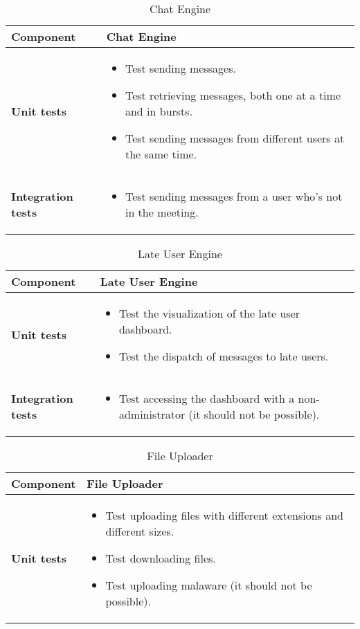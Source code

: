 \begin{table}[h]	
	\centering
	\def\arraystretch{1.5}
	\begin{tabular}{|m{4cm}|m{12cm}|}
		\hline
		\textbf{Component} & Chat Engine \\ \hline
		\textbf{Unit tests} & 
			\begin{itemize}
			\item Test sending messages.
			\item Test retrieving messages, both one at a time and in bursts.
			\item Test sending messages from different users at the same time.
			\end{itemize} \\ \hline
		\textbf{Integration tests} & 
			\begin{itemize}
			\item Test sending messages from a user who's not in the meeting.
			\end{itemize} \\ \hline
	\end{tabular}
	\caption{Chat Engine}
\end{table}

\begin{table}[h]	
	\centering
	\def\arraystretch{1.5}
	\begin{tabular}{|m{4cm}|m{12cm}|}
		\hline
		\textbf{Component} & Late User Engine \\ \hline
		\textbf{Unit tests} & 
			\begin{itemize}
			\item Test the visualization of the late user dashboard.
			\item Test the dispatch of messages to late users.
			\end{itemize} \\ \hline
		\textbf{Integration tests} & 
			\begin{itemize}
			\item Test accessing the dashboard with a non-administrator (it should not be possible).
			\end{itemize} \\ \hline
	\end{tabular}
	\caption{Late User Engine}
\end{table}

\begin{table}[h]	
	\centering
	\def\arraystretch{1.5}
	\begin{tabular}{|m{4cm}|m{12cm}|}
		\hline
		\textbf{Component} & File Uploader \\ \hline
		\textbf{Unit tests} & 
			\begin{itemize}
			\item Test uploading files with different extensions and different sizes.
			\item Test downloading files.
			\item Test uploading malaware (it should not be possible).
			\end{itemize} \\ \hline
	\end{tabular}
	\caption{File Uploader}
\end{table}

